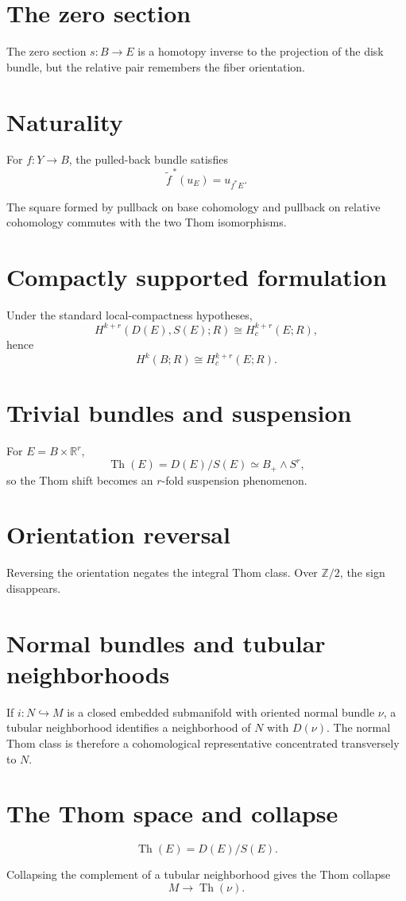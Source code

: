 \section{The zero section}
The zero section $s:B\to E$ is a homotopy inverse to the projection of the disk
bundle, but the relative pair remembers the fiber orientation.

\section{Naturality}
For $f:Y\to B$, the pulled-back bundle satisfies
\[
\widetilde f^{\,*}(u_E)=u_{f^*E}.
\]
\begin{theorem}[Naturality]
\label{thm:viii31-thom-naturality}
The square formed by pullback on base cohomology and pullback on relative
cohomology commutes with the two Thom isomorphisms.
\end{theorem}

\section{Compactly supported formulation}
Under the standard local-compactness hypotheses,
\[
H^{k+r}(D(E),S(E);R)\cong H_c^{k+r}(E;R),
\]
hence
\[
H^k(B;R)\cong H_c^{k+r}(E;R).
\]

\section{Trivial bundles and suspension}
For $E=B\times\mathbb R^r$,
\[
\operatorname{Th}(E)=D(E)/S(E)\simeq B_+\wedge S^r,
\]
so the Thom shift becomes an $r$-fold suspension phenomenon.

\section{Orientation reversal}
Reversing the orientation negates the integral Thom class.  Over
$\mathbb Z/2$, the sign disappears.

\section{Normal bundles and tubular neighborhoods}
If $i:N\hookrightarrow M$ is a closed embedded submanifold with oriented normal
bundle $\nu$, a tubular neighborhood identifies a neighborhood of $N$ with
$D(\nu)$.  The normal Thom class is therefore a cohomological representative
concentrated transversely to $N$.

\section{The Thom space and collapse}
\begin{definition}
\label{def:viii31-thom-space}
\[
\operatorname{Th}(E)=D(E)/S(E).
\]
\end{definition}
Collapsing the complement of a tubular neighborhood gives the Thom collapse
\[
M\longrightarrow \operatorname{Th}(\nu).
\]

